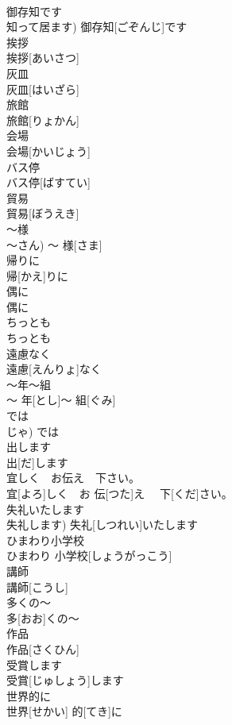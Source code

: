 \documentclass[8pt]{extreport}
\begin{document}
\begin{CJK}{UTF8}{min}
\\	御存知です	
\\	知って居ます)	御存知[ごぞんじ]です	
\\	挨拶
\\	挨拶[あいさつ]
\\	灰皿	
\\	灰皿[はいざら]	
\\	旅館	
\\	旅館[りょかん]	
\\	会場	
\\	会場[かいじょう]	
\\	バス停	
\\	バス停[ばすてい]	
\\	貿易	
\\	貿易[ぼうえき]	
\\	〜様	
\\	〜さん)	〜 様[さま]	
\\	帰りに	
\\	帰[かえ]りに	
\\	偶に	
\\	偶に	
\\	ちっとも	
\\	ちっとも	
\\	遠慮なく	
\\	遠慮[えんりょ]なく	
\\	〜年〜組	
\\	〜 年[とし]〜 組[ぐみ]	
\\	では	
\\	じゃ)	では	
\\	出します	
\\	出[だ]します	
\\	宜しく　お伝え　下さい。	
\\	宜[よろ]しく　お 伝[つた]え　 下[くだ]さい。	
\\	失礼いたします	
\\	失礼します)	失礼[しつれい]いたします	
\\	ひまわり小学校	
\\	ひまわり 小学校[しょうがっこう]	
\\	講師	
\\	講師[こうし]	
\\	多くの〜	
\\	多[おお]くの〜	
\\	作品	
\\	作品[さくひん]	
\\	受賞します	
\\	受賞[じゅしょう]します	
\\	世界的に	
\\	世界[せかい] 的[てき]に	

\end{CJK}
\end{document}
